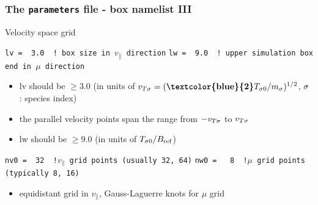 \documentclass[9pt]{beamer}
\newcommand{\cB}[1]{\textcolor{blue}{#1}}
\begin{document}
\begin{frame}[fragile]
  \frametitle{The {\tt parameters} file - box namelist III}
\begin{block}{Velocity space grid}
\begin{block}

\verb|lv =  3.0  ! box size in |$v_\parallel$\verb| direction|
\verb|lw =  9.0  ! upper simulation box end in |$\mu$\verb| direction|
\end{block}

\begin{itemize}
\item lv should be $\geq 3.0$ (in units of $v_{T\spec}=(\textbf{\cB{2}}T_{\spec 0}/m_\spec)^{1/2}$, $\sigma$ : species index)
\item the parallel velocity points span the range from $-v_{T\sigma}$ to $v_{T\sigma}$
\item lw should be $\geq 9.0$ (in units of $T_{\sigma 0}/B_{\rm ref}$)
\end{itemize}
\begin{block}

\verb|nv0 =  32  !|$v_\parallel$\verb| grid points (usually 32, 64)|
\verb|nw0 =   8  !|$\mu$\verb| grid points (typically 8, 16) |
\end{block}
\begin{itemize}
\item equidistant grid in $v_\|$, Gauss-Laguerre knots for $\mu$ grid
\end{itemize}

\end{block}

\end{frame}


\end{document}

